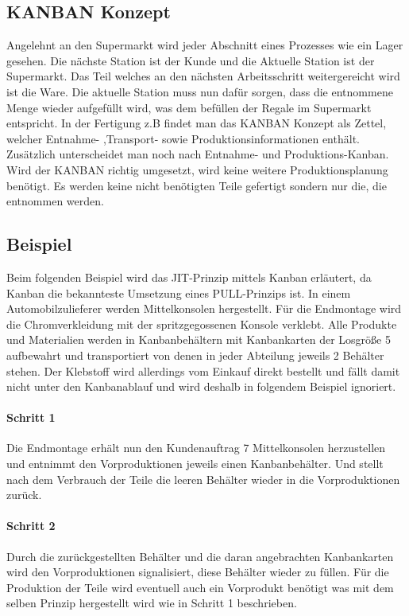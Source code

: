 \documentclass[00_ToyotaProduktionssystem.tex]{subfiles}
\begin{document}
\subsection{KANBAN Konzept}
Angelehnt an den Supermarkt wird jeder Abschnitt eines Prozesses wie ein Lager gesehen. Die nächste Station ist der Kunde und die Aktuelle Station ist der Supermarkt. Das Teil welches an den nächsten Arbeitsschritt weitergereicht wird ist die Ware. Die aktuelle Station muss nun dafür sorgen, dass die entnommene Menge wieder aufgefüllt wird, was dem befüllen der Regale im Supermarkt entspricht.
In der Fertigung z.B findet man das KANBAN Konzept als Zettel, welcher Entnahme- ,Transport- sowie Produktionsinformationen enthält.
Zusätzlich unterscheidet man noch nach Entnahme- und Produktions-Kanban.
Wird der KANBAN richtig umgesetzt, wird keine weitere Produktionsplanung benötigt. Es werden keine nicht benötigten Teile gefertigt sondern nur die, die entnommen werden.

\subsection{Beispiel}
Beim folgenden Beispiel wird das JIT-Prinzip mittels Kanban erläutert, da Kanban die bekannteste Umsetzung eines PULL-Prinzips ist.
In einem Automobilzulieferer werden Mittelkonsolen hergestellt. Für die Endmontage wird die Chromverkleidung mit der spritzgegossenen Konsole verklebt. Alle Produkte und Materialien werden in Kanbanbehältern mit Kanbankarten der Losgröße 5 aufbewahrt und transportiert von denen in jeder Abteilung jeweils 2 Behälter stehen. Der Klebstoff wird allerdings vom Einkauf direkt bestellt und fällt damit nicht unter den Kanbanablauf und wird deshalb in folgendem Beispiel ignoriert.

\paragraph{Schritt 1}
Die Endmontage erhält nun den Kundenauftrag 7 Mittelkonsolen herzustellen und entnimmt den Vorproduktionen jeweils einen Kanbanbehälter. Und stellt nach dem Verbrauch der Teile die leeren Behälter wieder in die Vorproduktionen zurück.

\paragraph{Schritt 2}
Durch die zurückgestellten Behälter und die daran angebrachten Kanbankarten wird den Vorproduktionen signalisiert, diese Behälter wieder zu füllen. Für die Produktion der Teile wird eventuell auch ein Vorprodukt benötigt was mit dem selben Prinzip hergestellt wird wie in Schritt 1 beschrieben.
\end{document}
